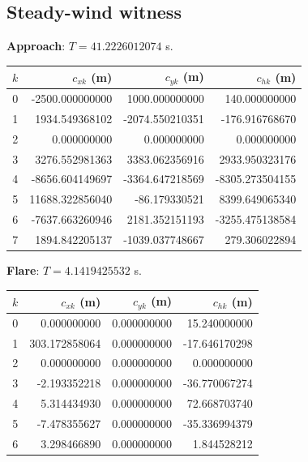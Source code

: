 \subsection*{Steady-wind witness}
\textbf{Approach}: $T=41.2226012074$ s.\par
\begin{center}\small\begin{tabular}{@{}rrrr@{}}\toprule $k$ & $c_{xk}$ (m) & $c_{yk}$ (m) & $c_{hk}$ (m)\\\midrule
0 & -2500.000000000 & 1000.000000000 & 140.000000000\\
1 & 1934.549368102 & -2074.550210351 & -176.916768670\\
2 & 0.000000000 & 0.000000000 & 0.000000000\\
3 & 3276.552981363 & 3383.062356916 & 2933.950323176\\
4 & -8656.604149697 & -3364.647218569 & -8305.273504155\\
5 & 11688.322856040 & -86.179330521 & 8399.649065340\\
6 & -7637.663260946 & 2181.352151193 & -3255.475138584\\
7 & 1894.842205137 & -1039.037748667 & 279.306022894\\
\bottomrule\end{tabular}\end{center}
\textbf{Flare}: $T=4.1419425532$ s.\par
\begin{center}\small\begin{tabular}{@{}rrrr@{}}\toprule $k$ & $c_{xk}$ (m) & $c_{yk}$ (m) & $c_{hk}$ (m)\\\midrule
0 & 0.000000000 & 0.000000000 & 15.240000000\\
1 & 303.172858064 & 0.000000000 & -17.646170298\\
2 & 0.000000000 & 0.000000000 & 0.000000000\\
3 & -2.193352218 & 0.000000000 & -36.770067274\\
4 & 5.314434930 & 0.000000000 & 72.668703740\\
5 & -7.478355627 & 0.000000000 & -35.336994379\\
6 & 3.298466890 & 0.000000000 & 1.844528212\\
\bottomrule\end{tabular}\end{center}
\clearpage